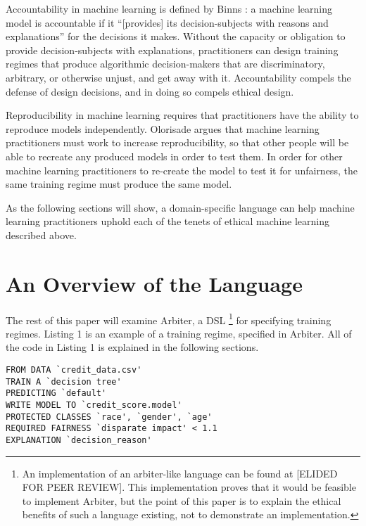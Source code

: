 \documentclass[letterpaper]{article}
\begin{document}
Accountability in machine learning is defined by Binns : a machine learning model is accountable if it ``[provides] its decision-subjects with reasons and explanations'' for the decisions it makes. Without the capacity or obligation to provide decision-subjects with explanations, practitioners can design training regimes that produce algorithmic decision-makers that are discriminatory, arbitrary, or otherwise unjust, and get away with it. Accountability compels the defense of design decisions, and in doing so compels ethical design.

Reproducibility in machine learning requires that practitioners have the ability to reproduce models independently. Olorisade  argues that machine learning practitioners must work to increase reproducibility, so that other people will be able to recreate any produced models in order to test them. In order for other machine learning practitioners to re-create the model to test it for unfairness, the same training regime must produce the same model.

As the following sections will show, a domain-specific language can help machine learning practitioners uphold each of the tenets of ethical machine learning described above.

\section{An Overview of the Language}
The rest of this paper will examine Arbiter, a DSL \footnote{An implementation of an arbiter-like language can be found at [ELIDED FOR PEER REVIEW]. This implementation proves that it would be feasible to implement Arbiter, but the point of this paper is to explain the ethical benefits of such a language existing, not to demonstrate an implementation.} for specifying training regimes. Listing 1 is an example of a training regime, specified in Arbiter. All of the code in Listing 1 is explained in the following sections.

\begin{lstlisting}[caption=Arbiter example.]
FROM DATA `credit_data.csv'
TRAIN A `decision tree'
PREDICTING `default'
WRITE MODEL TO `credit_score.model'
PROTECTED CLASSES `race', `gender', `age'
REQUIRED FAIRNESS `disparate impact' < 1.1
EXPLANATION `decision_reason'
\end{lstlisting}
\end{document}
